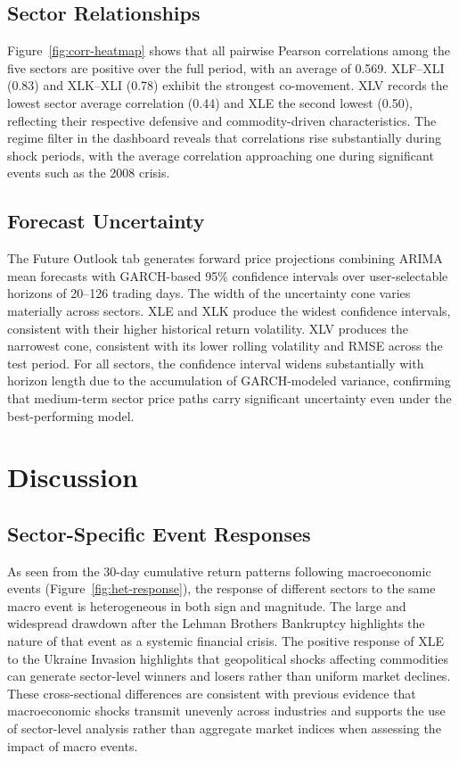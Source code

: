 \documentclass[12pt]{article}
\begin{document}
\subsection{Sector Relationships}

Figure~\ref{fig:corr-heatmap} shows that all pairwise Pearson correlations among the five sectors are positive over the full period, with an average of 0.569. XLF--XLI (0.83) and XLK--XLI (0.78) exhibit the strongest co-movement. XLV records the lowest sector average correlation (0.44) and XLE the second lowest (0.50), reflecting their respective defensive and commodity-driven characteristics. The regime filter in the dashboard reveals that correlations rise substantially during shock periods, with the average correlation approaching one during significant events such as the 2008 crisis.

\subsection{Forecast Uncertainty}

The Future Outlook tab generates forward price projections combining ARIMA mean forecasts with GARCH-based 95\% confidence intervals over user-selectable horizons of 20--126 trading days. The width of the uncertainty cone varies materially across sectors. XLE and XLK produce the widest confidence intervals, consistent with their higher historical return volatility. XLV produces the narrowest cone, consistent with its lower rolling volatility and RMSE across the test period. For all sectors, the confidence interval widens substantially with horizon length due to the accumulation of GARCH-modeled variance, confirming that medium-term sector price paths carry significant uncertainty even under the best-performing model.

\section{Discussion}
\subsection{Sector-Specific Event Responses}

As seen from the 30-day cumulative return patterns following macroeconomic events (Figure~\ref{fig:het-response}), the response of different sectors to the same macro event is heterogeneous in both sign and magnitude. The large and widespread drawdown after the Lehman Brothers Bankruptcy highlights the nature of that event as a systemic financial crisis. The positive response of XLE to the Ukraine Invasion highlights that geopolitical shocks affecting commodities can generate sector-level winners and losers rather than uniform market declines. These cross-sectional differences are consistent with previous evidence that macroeconomic shocks transmit unevenly across industries \cite{ewing2003, ewing2002} and supports the use of sector-level analysis rather than aggregate market indices when assessing the impact of macro events.
\end{document}
